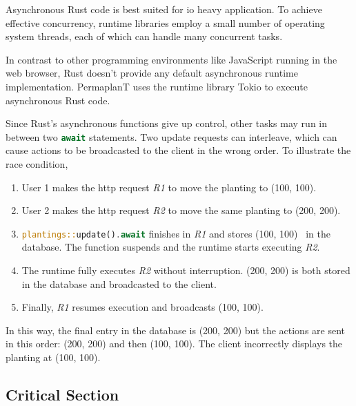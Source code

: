\documentclass[final,oneside]{vutinfth}
\newcommand{\rustsnippet}[1]{\lstinline[language=rust]{#1}}
\begin{document}
Asynchronous Rust code is best suited for \gls{io} heavy application.
To achieve effective concurrency, runtime libraries employ a small number of operating system threads, each of which can handle many concurrent tasks\cite{rustasyncbookchapter}. 

In contrast to other programming environments like JavaScript running in the web browser\cite{mdnjavascripteventloop}, Rust doesn't provide any default asynchronous runtime implementation.
PermaplanT uses the runtime library Tokio \cite{tokiocrate} to execute asynchronous Rust code.

Since Rust's asynchronous functions give up control, other tasks may run in between two \rustsnippet{await} statements.
Two update requests can interleave, which can cause actions to be broadcasted to the client in the wrong order.
To illustrate the race condition,
\begin{enumerate}
    \item User 1 makes the \gls{http} request \textit{R1} to move the planting to (100, 100).
    \item User 2 makes the \gls{http} request \textit{R2} to move the same planting to (200, 200).
    \item \rustsnippet{plantings::update().await} finishes in \textit{R1} and stores (100, 100) \
    in the database. The function suspends and the runtime starts executing \textit{R2}.
    \item The runtime fully executes \textit{R2} without interruption.
    (200, 200) is both stored in the database and broadcasted to the client.
    \item Finally, \textit{R1} resumes execution and broadcasts (100, 100).
\end{enumerate}

In this way, the final entry in the database is (200, 200) but the actions are sent in this order: (200, 200) and then (100, 100).
The client incorrectly displays the planting at (100, 100).

\subsection{Critical Section}
\end{document}
